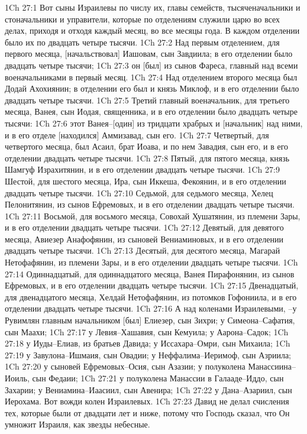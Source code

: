 1Ch 27:1  Вот сыны Израилевы по числу их, главы семейств, тысяченачальники и стоначальники и управители, которые по отделениям служили царю во всех делах, приходя и отходя каждый месяц, во все месяцы года. В каждом отделении было их по двадцать четыре тысячи.
1Ch 27:2  Над первым отделением, для первого месяца, [начальствовал] Иашовам, сын Завдиила; в его отделении было двадцать четыре тысячи;
1Ch 27:3  он [был] из сынов Фареса, главный над всеми военачальниками в первый месяц.
1Ch 27:4  Над отделением второго месяца был Додай Ахохиянин; в отделении его был и князь Миклоф, и в его отделении было двадцать четыре тысячи.
1Ch 27:5  Третий главный военачальник, для третьего месяца, Ванея, сын Иодая, священника, и в его отделении было двадцать четыре тысячи:
1Ch 27:6  этот Ванея--[один] из тридцати храбрых и [начальник] над ними, и в его отделе [находился] Аммизавад, сын его.
1Ch 27:7  Четвертый, для четвертого месяца, был Асаил, брат Иоава, и по нем Завадия, сын его, и в его отделении двадцать четыре тысячи.
1Ch 27:8  Пятый, для пятого месяца, князь Шамгуф Израхитянин, и в его отделении двадцать четыре тысячи.
1Ch 27:9  Шестой, для шестого месяца, Ира, сын Иккеша, Фекоянин, и в его отделении двадцать четыре тысячи.
1Ch 27:10  Седьмой, для седьмого месяца, Хелец Пелонитянин, из сынов Ефремовых, и в его отделении двадцать четыре тысячи.
1Ch 27:11  Восьмой, для восьмого месяца, Совохай Хушатянин, из племени Зары, и в его отделении двадцать четыре тысячи.
1Ch 27:12  Девятый, для девятого месяца, Авиезер Анафофянин, из сыновей Вениаминовых, и в его отделении двадцать четыре тысячи.
1Ch 27:13  Десятый, для десятого месяца, Магарай Нетофафянин, из племени Зары, и в его отделении двадцать четыре тысячи.
1Ch 27:14  Одиннадцатый, для одиннадцатого месяца, Ванея Пирафонянин, из сынов Ефремовых, и в его отделении двадцать четыре тысячи.
1Ch 27:15  Двенадцатый, для двенадцатого месяца, Хелдай Нетофафянин, из потомков Гофониила, и в его отделении двадцать четыре тысячи.
1Ch 27:16  А над коленами Израилевыми, --у Рувимлян главным начальником [был] Елиезер, сын Зихри; у Симеона--Сафатия, сын Маахи;
1Ch 27:17  у Левия--Хашавия, сын Кемуила; у Аарона--Садок;
1Ch 27:18  у Иуды--Елиав, из братьев Давида; у Иссахара--Омри, сын Михаила;
1Ch 27:19  у Завулона--Ишмаия, сын Овадии; у Неффалима--Иеримоф, сын Азриила;
1Ch 27:20  у сыновей Ефремовых--Осия, сын Азазии; у полуколена Манассиина--Иоиль, сын Федаии;
1Ch 27:21  у полуколена Манассии в Галааде--Иддо, сын Захарии; у Вениамина--Иаасиил, сын Авенира;
1Ch 27:22  у Дана--Азариил, сын Иерохама. Вот вожди колен Израилевых.
1Ch 27:23  Давид не делал счисления тех, которые были от двадцати лет и ниже, потому что Господь сказал, что Он умножит Израиля, как звезды небесные.
